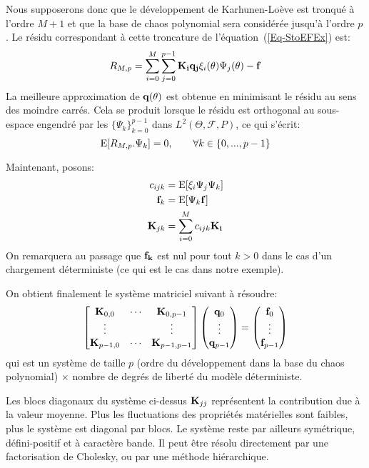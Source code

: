 \medskip
Nous supposerons donc que le développement de Karhunen-Loève est tronqué à l'ordre $M+1$ et que la base de chaos polynomial sera considérée jusqu'à l'ordre $p$. Le résidu correspondant à cette troncature de l'équation~(\ref{Eq-StoEFEx}) est:
\begin{equation}
R_{M,p} = 
\dsum_{i=0}^M\dsum_{j=0}^{p-1} \MM{K_i}\VV{q_j}\xi_i(\theta)\Psi_j(\theta) - \VV{f}
\end{equation}
La meilleure approximation de $\VV{q(\theta)}$ est obtenue en minimisant le résidu au sens des moindre carrés. Cela se produit lorsque le résidu est orthogonal au sous-espace engendré par les $\{\Psi_k\}_{k=0}^{p-1}$ dans $L^2(\Theta,\mathcal{F},P)$, ce qui s'écrit:
\begin{equation}
   \operatorname{E}[R_{M,p}.\Psi_k]=0, \qquad \forall k\in\{0, ..., p-1\}
\end{equation}

\medskip
Maintenant, posons:
\begin{align}
c_{ijk} & = \E{\xi_i\Psi_j\Psi_k}\\
\VV{f}_k & = \E{\Psi_k\VV{f}}\\
\MM{K}_{jk} & = \dsum_{i=0}^M c_{ijk}\MM{K_i}
\end{align}
On remarquera au passage que $\VV{f_k}$ est nul pour tout $k>0$ dans le cas d'un chargement déterministe (ce qui est le cas dans notre exemple).

\medskip
On obtient finalement le système matriciel suivant à résoudre:
\begin{equation}
\MM*{\MM{K}_{0,0} & \cdots & \MM{K}_{0,p-1}\\
\vdots & &\vdots\\
\MM{K}_{p-1,0} & \cdots & \MM{K}_{p-1,p-1}}
\VV*{\VV{q}_0 \\ \vdots \\ \VV{q}_{p-1}}
= \VV*{\VV{f}_0 \\ \vdots \\ \VV{f}_{p-1}}
\end{equation}
qui est un système de taille $p$ (ordre du développement dans la base du chaos polynomial) $\times$ nombre de degrés de liberté du modèle déterministe.

\medskip
Les blocs diagonaux du système ci-dessus $\MM{K}_{jj}$ représentent la contribution due à la valeur moyenne. Plus les fluctuations des propriétés matérielles sont faibles, plus le système est diagonal par blocs. Le système reste par ailleurs symétrique, défini-positif et à caractère bande.
Il peut être résolu directement par une factorisation de Cholesky, ou par une méthode hiérarchique.

